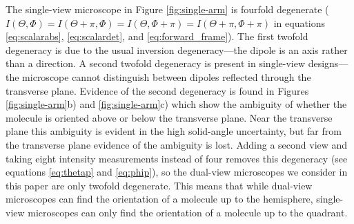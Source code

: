 \documentclass[10pt]{article}
\begin{document}
The single-view microscope in Figure \ref{fig:single-arm} is fourfold degenerate
($I(\Theta, \Phi) = I(\Theta + \pi, \Phi) = I(\Theta, \Phi + \pi) = I(\Theta +
\pi, \Phi+\pi)$ in equations \ref{eq:scalarabs}, \ref{eq:scalardet}, and
\ref{eq:forward_frame}). The first twofold degeneracy is due to the usual
inversion degeneracy---the dipole is an axis rather than a direction. A second
twofold degeneracy is present in single-view designs---the microscope cannot
distinguish between dipoles reflected through the transverse plane. Evidence of
the second degeneracy is found in Figures \ref{fig:single-arm}b) and
\ref{fig:single-arm}c) which show the ambiguity of whether the molecule is
oriented above or below the transverse plane. Near the transverse plane this
ambiguity is evident in the high solid-angle uncertainty, but far from the
transverse plane evidence of the ambiguity is lost. Adding a second view and
taking eight intensity measurements instead of four removes this degeneracy (see
equations \ref{eq:thetap} and \ref{eq:phip}), so the dual-view microscopes we
consider in this paper are only twofold degenerate. This means that while
dual-view microscopes can find the orientation of a molecule up to the
hemisphere, single-view microscopes can only find the orientation of a molecule
up to the quadrant.
\end{document}
